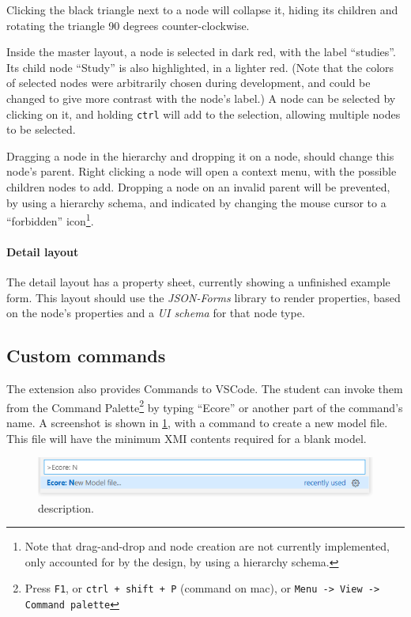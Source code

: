 Clicking the black triangle next to a node will collapse it, hiding its children and rotating the triangle 90 degrees counter-clockwise.

Inside the master layout, a node is selected in dark red, with the label ``studies''.
Its child node ``Study'' is also highlighted, in a lighter red.
(Note that the colors of selected nodes were arbitrarily chosen during development, and could be changed to give more contrast with the node's label.)
A node can be selected by clicking on it, and holding \texttt{ctrl} will add to the selection, allowing multiple nodes to be selected.

Dragging a node in the hierarchy and dropping it on a node, should change this node's parent.
Right clicking a node will open a context menu, with the possible children nodes to add.
Dropping a node on an invalid parent will be prevented, by using a hierarchy schema, and indicated by changing the mouse cursor to a ``forbidden'' icon\footnote{Note that drag-and-drop and node creation are not currently implemented, only accounted for by the design, by using a hierarchy schema.}.


\paragraph{Detail layout}
The detail layout has a property sheet, currently showing a unfinished example form.
This layout should use the \textit{JSON-Forms} library to render properties, based on the node's properties and a \textit{UI schema} for that node type.


\subsection{Custom commands}

The extension also provides Commands to \gls{VSCode}.
The student can invoke them from the Command Palette\footnote{Press \texttt{F1}, or \texttt{ctrl + shift + P} (command on mac), or \texttt{Menu -> View -> Command palette}} by typing ``Ecore'' or another part of the command's name.
A screenshot is shown in \cref{fig:gitpod-ext-newmodel}, with a command to create a new model file.
This file will have the minimum \acrshort{XMI} contents required for a blank model.

\begin{figure}[htbp]  %
  \centering
  \includegraphics[width=\textwidth]{figures/gitpod-vscode-newmodel.png}
  \caption[title]{description.}\label{fig:gitpod-ext-newmodel}
\end{figure}

